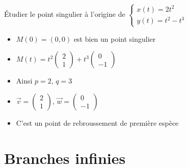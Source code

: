 \begin{frame}
\begin{exemple}
\'Etudier le point singulier à l'origine de 
$\left\{\begin{array}{l} x(t) = 2t^2\\ y(t) = t^2 - t^3\end{array}\right.$

\bigskip

\pause
\begin{minipage}{0.45\textwidth}
\end{minipage}
\begin{minipage}{0.5\textwidth}

\begin{itemize}
  \pause\item $M(0)=(0,0)$ est bien un point singulier
  
  \pause\item $\displaystyle M(t) = t^2 \begin{pmatrix}2\\1\end{pmatrix} + t^3 
\begin{pmatrix}0\\-1\end{pmatrix}$ 

  \pause\item Ainsi $p=2$, $q=3$
  
  \pause\item $\overrightarrow{v}=\left(\begin{smallmatrix}2\\1\end{smallmatrix}\right)$,
$\overrightarrow{w}=\left(\begin{smallmatrix}0\\-1\end{smallmatrix}\right)$

  \pause\item C'est un point de rebroussement de première espèce
\end{itemize}

\end{minipage}

\end{exemple}

\end{frame}

\section{Branches infinies}

